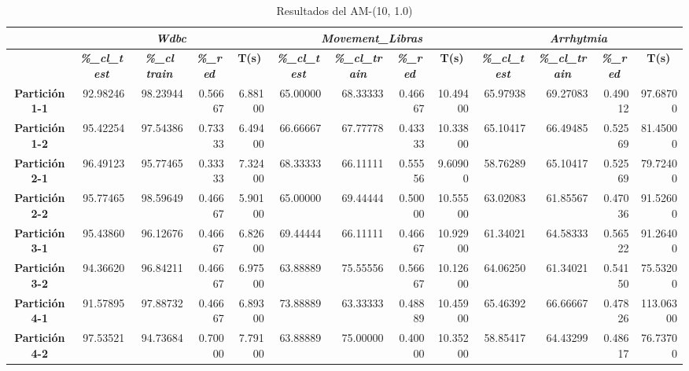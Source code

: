 \documentclass[a4paper,11pt]{article}
\begin{document}
 
 \begin{table}[H]	
  \caption{Resultados del AM-(10, 1.0)}
  \begin{adjustbox}{width=1.1\textwidth}
  \begin{tabular}{|c|r|r|r|r|r|r|r|r|r|r|r|r|}
  \hline
  \multicolumn{1}{|l|}{} & \multicolumn{ 4}{c|}{\textbf{\textit{Wdbc}}} & \multicolumn{ 4}{c|}{\textbf{\textit{Movement\_Libras}}} & \multicolumn{ 4}{c|}{\textbf{\textit{Arrhytmia}}} \\ \hline
  \multicolumn{1}{|l|}{} & \multicolumn{1}{c|}{\textbf{\textit{\%\_cl\_test}}} & \multicolumn{1}{c|}{\textbf{\textit{\%\_cl train}}} & \multicolumn{1}{c|}{\textbf{\textit{\%\_red}}} & \multicolumn{1}{c|}{\textbf{T(s)}} & \multicolumn{1}{c|}{\textbf{\textit{\%\_cl\_test}}} & \multicolumn{1}{c|}{\textbf{\textit{\%\_cl\_train}}} & \multicolumn{1}{c|}{\textbf{\textit{\%\_red}}} & \multicolumn{1}{c|}{\textbf{T(s)}} & \multicolumn{1}{c|}{\textbf{\textit{\%\_cl\_test}}} & \multicolumn{1}{c|}{\textbf{\textit{\%\_cl\_train}}} & \multicolumn{1}{c|}{\textbf{\textit{\%\_red}}} & \multicolumn{1}{c|}{\textbf{T(s)}} \\ \hline
  \textbf{Partición 1-1} & 92.98246 & 98.23944 & 0.56667 & 6.88100 & 65.00000 & 68.33333 & 0.46667 & 10.49400 & 65.97938 & 69.27083 & 0.49012 & 97.68700 \\ \hline
  \textbf{Partición 1-2} & 95.42254 & 97.54386 & 0.73333 & 6.49400 & 66.66667 & 67.77778 & 0.43333 & 10.33800 & 65.10417 & 66.49485 & 0.52569 & 81.45000 \\ \hline
  \textbf{Partición 2-1} & 96.49123 & 95.77465 & 0.33333 & 7.32400 & 68.33333 & 66.11111 & 0.55556 & 9.60900 & 58.76289 & 65.10417 & 0.52569 & 79.72400 \\ \hline
  \textbf{Partición 2-2} & 95.77465 & 98.59649 & 0.46667 & 5.90100 & 65.00000 & 69.44444 & 0.50000 & 10.55500 & 63.02083 & 61.85567 & 0.47036 & 91.52600 \\ \hline
  \textbf{Partición 3-1} & 95.43860 & 96.12676 & 0.46667 & 6.82600 & 69.44444 & 66.11111 & 0.46667 & 10.92900 & 61.34021 & 64.58333 & 0.56522 & 91.26400 \\ \hline
  \textbf{Partición 3-2} & 94.36620 & 96.84211 & 0.46667 & 6.97500 & 63.88889 & 75.55556 & 0.56667 & 10.12600 & 64.06250 & 61.34021 & 0.54150 & 75.53200 \\ \hline
  \textbf{Partición 4-1} & 91.57895 & 97.88732 & 0.46667 & 6.89300 & 73.88889 & 63.33333 & 0.48889 & 10.45900 & 65.46392 & 66.66667 & 0.47826 & 113.06300 \\ \hline
  \textbf{Partición 4-2} & 97.53521 & 94.73684 & 0.70000 & 7.79100 & 63.88889 & 75.00000 & 0.40000 & 10.35200 & 58.85417 & 64.43299 & 0.48617 & 76.73700 \\ \hline

\end{tabular}
\end{adjustbox}
\end{table}
\end{document}
